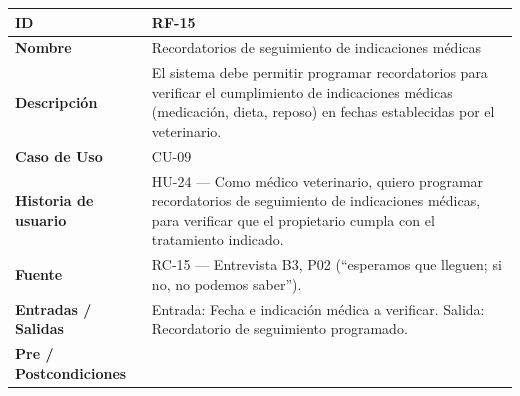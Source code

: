 \documentclass[
]{article}
\newcounter{none} %
\begin{document}
{\def\LTcaptype{none} %
\begin{longtable}[]{|
  >{\raggedright\arraybackslash}p{}|
  >{\raggedright\arraybackslash}p{}|}
\hline
\begin{minipage}[b]{\linewidth}\raggedright
\textbf{ID}
\end{minipage} & \begin{minipage}[b]{\linewidth}\raggedright
RF-15
\end{minipage} \\
\hline
\endhead
\hline
\endlastfoot
\textbf{Nombre} & \begin{minipage}[t]{\linewidth}\raggedright
Recordatorios de seguimiento de indicaciones médicas
\end{minipage} \\
\hline
\textbf{Descripción} & \begin{minipage}[t]{\linewidth}\raggedright
El sistema debe permitir programar recordatorios para verificar el cumplimiento de indicaciones médicas (medicación, dieta, reposo) en fechas establecidas por el veterinario.
\end{minipage} \\
\hline
\textbf{Caso de Uso} & \begin{minipage}[t]{\linewidth}\raggedright
CU-09
\end{minipage} \\
\hline
\textbf{Historia de usuario} & \begin{minipage}[t]{\linewidth}\raggedright
HU-24 — Como médico veterinario, quiero programar recordatorios de seguimiento de indicaciones médicas, para verificar que el propietario cumpla con el tratamiento indicado.
\end{minipage} \\
\hline
\textbf{Fuente} & \begin{minipage}[t]{\linewidth}\raggedright
RC-15 — Entrevista B3, P02 (“esperamos que lleguen; si no, no podemos saber”).
\end{minipage} \\
\hline
\textbf{Entradas / Salidas} & \begin{minipage}[t]{\linewidth}\raggedright
Entrada: Fecha e indicación médica a verificar. Salida: Recordatorio de seguimiento programado.
\end{minipage} \\
\hline
\textbf{Pre / Postcondiciones} & \begin{minipage}[t]{\linewidth}\raggedright

\end{minipage}
\end{longtable}}
\end{document}
